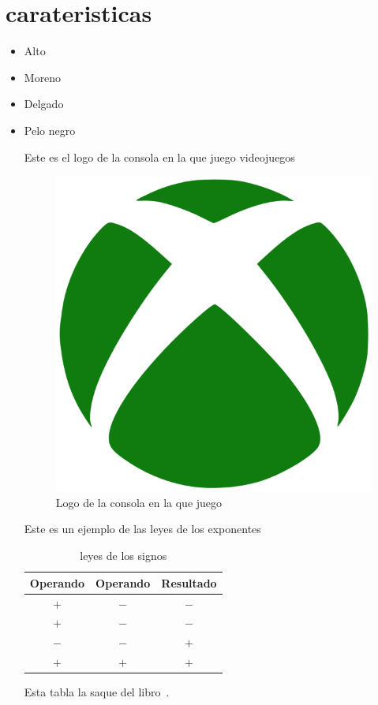 \section{ carateristicas}
\begin{itemize}
\item    Alto
\item   Moreno
\item   Delgado
  \item  Pelo negro

  Este es el logo de la consola en la que juego videojuegos\\
  
  \begin{figure}[h]
  \centering
  \includegraphics[scale=.5]{IMG/15.png}
  \caption{Logo de la consola en la que juego}
  \label{fig:Logo de xbox}
  \end{figure}



    
\begin{table}[h]
   Este es un ejemplo de las leyes de los exponentes\\
  \centering
  \begin{tabular}{| c | c | c | }
    \hline
    Operando & Operando & Resultado\\\hline
    $+$ & $-$ & $-$\\\hline
    $+$ & $-$ & $-$\\\hline
    $-$ & $-$ & $+$\\\hline
    $+$ & $+$ & $+$\\\hline
  \end{tabular}
  \caption{leyes de los signos}
  \label{tabla :leyes de los signos}
  \end{table}
Esta tabla la saque del libro~\cite{Floodlight}.





\end{itemize}
